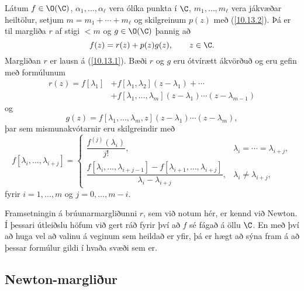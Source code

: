 \begin{se}  Látum $f\in \O(\C)$, $\alpha_1,\dots,\alpha_\ell$ vera ólíka
punkta í $\C$, $m_1,\dots,m_\ell$ vera jákvæðar heiltölur, setjum
$m=m_1+\cdots+m_\ell$ og skilgreinum $p(z)$ með (\ref{10.13.2}).  Þá er til
margliða $r$ af stigi $<m$
og $g\in \O(\C)$ þannig að
\begin{equation*}
f(z)=r(z)+p(z)g(z), \qquad z\in \C.\label{10.13.3}
\end{equation*}
Margliðan $r$ er lausn á  (\ref{10.13.1}).
Bæði $r$ og $g$ eru ótvírætt ákvörðuð og eru gefin með
formúlunum
\begin{align*}
r(z)=f[\lambda_1]&+f[\lambda_1,\lambda_2](z-\lambda_1)+\cdots\\
&+ f[\lambda_1,\dots,\lambda_m](z-\lambda_1)\cdots(z-\lambda_{m-1})
\end{align*}
og 
$$
g(z)=f[\lambda_1,\dots,\lambda_m,z](z-\lambda_1)\cdots(z-\lambda_m),
$$
þar sem mismunakvótarnir eru skilgreindir með
\begin{equation*}
f[\lambda_i,\dots,\lambda_{i+j}]=
\begin{cases}\dfrac{f^{(j)}(\lambda_i)}{j!},& 
\lambda_i=\cdots=\lambda_{i+j}, \\
\dfrac{f[\lambda_i,\dots,\lambda_{i+j-1}]-f[\lambda_{i+1},\dots,\lambda_{i+j}]}
{\lambda_i-\lambda_{i+j}},&\lambda_i\neq \lambda_{i+j}, 
\end{cases}
\label{10.13.4}
\end{equation*}
fyrir $i=1,\dots,m$ og $j=0,\dots,m-i$.
 \end{se}


\medskip
Framsetningin  á brúunarmargliðunni
$r$, sem við notum hér, er kennd við
Newton.  Í þessari útleiðslu
höfum við gert ráð fyrir því að $f$ sé fágað á öllu $\C$.  En með
því að huga vel að valinu á veginum sem heildað er yfir, þá er hægt að
sýna fram á að þessar formúlur gildi í hvaða svæði sem er.


\subsection*{Newton-margliður}


